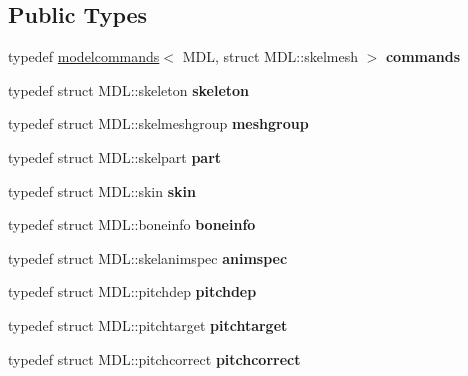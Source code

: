 \subsection*{Public Types}
\begin{DoxyCompactItemize}
\item 
\mbox{\label{structskelcommands_a2c8fc43060ae9fcca33737e301081ddf}} 
typedef \hyperlink{structmodelcommands}{modelcommands}$<$ M\+DL, struct M\+D\+L\+::skelmesh $>$ {\bfseries commands}
\item 
\mbox{\label{structskelcommands_ac9ec339b070771d2c95907ed17236fe3}} 
typedef struct M\+D\+L\+::skeleton {\bfseries skeleton}
\item 
\mbox{\label{structskelcommands_a2cdd396548617a935a63aafff42e80ae}} 
typedef struct M\+D\+L\+::skelmeshgroup {\bfseries meshgroup}
\item 
\mbox{\label{structskelcommands_a02d43d8def1a3caf7952ce91427a4077}} 
typedef struct M\+D\+L\+::skelpart {\bfseries part}
\item 
\mbox{\label{structskelcommands_aa7536602b6a8f3c32df1f8350f6dfdc8}} 
typedef struct M\+D\+L\+::skin {\bfseries skin}
\item 
\mbox{\label{structskelcommands_a475a593a5b9455e1dd020f870b7fd5d2}} 
typedef struct M\+D\+L\+::boneinfo {\bfseries boneinfo}
\item 
\mbox{\label{structskelcommands_a9a00403c1064e56d70f84df62f43ef6c}} 
typedef struct M\+D\+L\+::skelanimspec {\bfseries animspec}
\item 
\mbox{\label{structskelcommands_a3007df0b61b2fb007a8d6966758c3c8f}} 
typedef struct M\+D\+L\+::pitchdep {\bfseries pitchdep}
\item 
\mbox{\label{structskelcommands_ad7f4ab6b0c436d313fa119c7edeaf7d4}} 
typedef struct M\+D\+L\+::pitchtarget {\bfseries pitchtarget}
\item 
\mbox{\label{structskelcommands_a04fb29639465ad8712e8b4570298b6f6}} 
typedef struct M\+D\+L\+::pitchcorrect {\bfseries pitchcorrect}
\end{DoxyCompactItemize}
